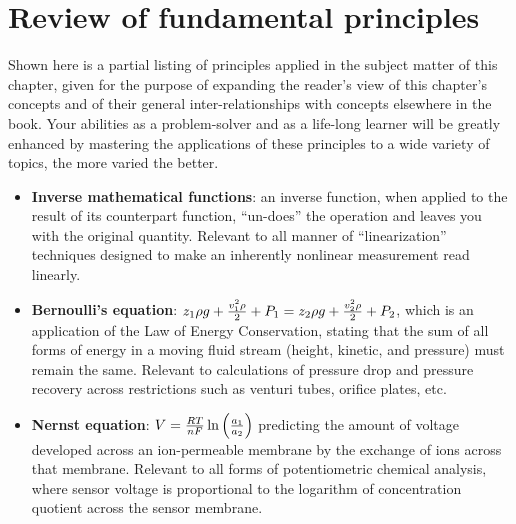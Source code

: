 






\filbreak
\section{Review of fundamental principles}

Shown here is a partial listing of principles applied in the subject matter of this chapter, given for the purpose of expanding the reader's view of this chapter's concepts and of their general inter-relationships with concepts elsewhere in the book.  Your abilities as a problem-solver and as a life-long learner will be greatly enhanced by mastering the applications of these principles to a wide variety of topics, the more varied the better.

\begin{itemize}
\item \textbf{Inverse mathematical functions}: an inverse function, when applied to the result of its counterpart function, ``un-does'' the operation and leaves you with the original quantity.  Relevant to all manner of ``linearization'' techniques designed to make an inherently nonlinear measurement read linearly.
\item \textbf{Bernoulli's equation}: $z_1 \rho g + {v_1^2 \rho \over 2} + P_1 = z_2 \rho g + {v_2^2 \rho \over 2} + P_2$, which is an application of the Law of Energy Conservation, stating that the sum of all forms of energy in a moving fluid stream (height, kinetic, and pressure) must remain the same.  Relevant to calculations of pressure drop and pressure recovery across restrictions such as venturi tubes, orifice plates, etc.
\item \textbf{Nernst equation}: $V = {{R T} \over {nF}} \ln \left({a_1 \over a_2}\right)$ predicting the amount of voltage developed across an ion-permeable membrane by the exchange of ions across that membrane.  Relevant to all forms of potentiometric chemical analysis, where sensor voltage is proportional to the logarithm of concentration quotient across the sensor membrane.
\end{itemize}











